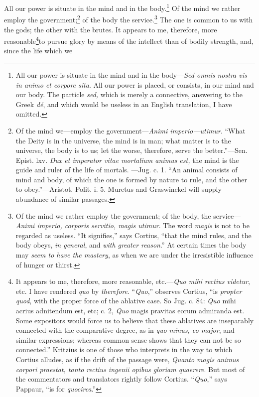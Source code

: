 All our power is situate in the mind and in the body.\footnote{All our power is situate in the mind and in the body—\emph{Sed
omnis nostra vis in animo et corpore sita}. All our power is placed,
or consists, in our mind and our body. The particle \emph{sed,} which is
merely a connective, answering to the Greek \emph{dé}, and which would be
useless in an English translation, I have omitted.} Of the mind
we rather employ the government;\footnote{Of the mind we—employ the government—\emph{Animi imperio—utimur}.
``What the Deity is in the universe, the mind is in man; what matter
is to the universe, the body is to us; let the worse, therefore,
serve the better.''—Sen. Epist. lxv. \emph{Dux et imperator vitae mortalium
animus est,} the mind is the guide and ruler of the life of mortals.
—Jug. c. 1. ``An animal consists of mind and body, of which the one
is formed by nature to rule, and the other to obey.''—Aristot. Polit.
i. 5. Muretus and Graswinckel will supply abundance of similar passages.} of the body the service.\footnote{Of the mind we rather employ the government; of the body, the
service—\emph{Animi imperio, corporis servitio, magis utimur}. The word
\emph{magis} is not to be regarded as useless. ``It signifies,'' says Cortius,
``that the mind rules, and the body obeys, \emph{in general}, and \emph{with
greater reason}.'' At certain times the body may \emph{seem to have the
mastery}, as when we are under the irresistible influence of hunger
or thirst.} The
one is common to us with the gods; the other with the brutes. It
appears to me, therefore, more reasonable\footnote{It appears to me, therefore, more reasonable, etc.—\emph{Quo mihi
rectius videtur}, etc. I have rendered \emph{quo} by \emph{therefore}. ``\emph{Quo},''
observes Cortius, ``is \emph{propter quod}, with the proper force of the
ablative case. So Jug. c. 84: \emph{Quo} mihi acrius adnitendum est, etc;
c. 2, \emph{Quo} magis pravitas eorum admiranda est. Some expositors would
force us to believe that these ablatives are inseparably connected
with the comparative degree, as in \emph{quo minus, eo major}, and similar
expressions; whereas common sense shows that they can not be so
connected.'' Kritzius is one of those who interprets in the way to
which Cortius alludes, as if the drift of the passage were, \emph{Quanto
magis animus corpori praestat, tanto rectius ingenii opibus gloriam
quaerere}. But most of the commentators and translators rightly follow
Cortius. ``\emph{Quo},'' says Pappaur, ``is for \emph{quocirca}.''}to pursue glory by means
of the intellect than of bodily strength, and, since the life which we

